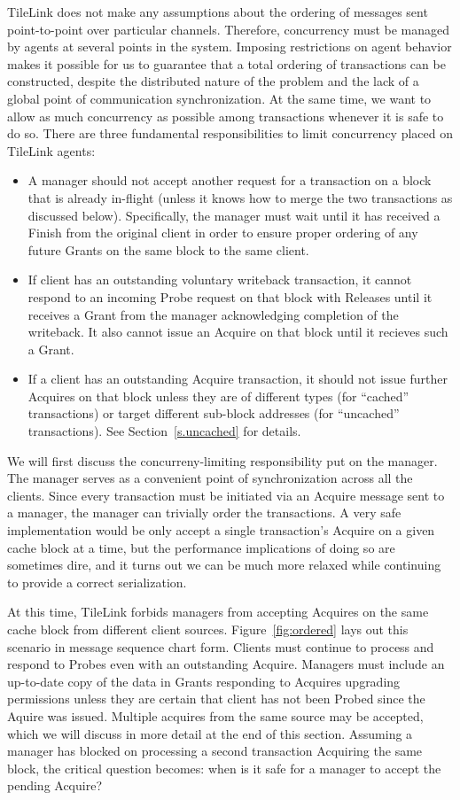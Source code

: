 TileLink does not make any assumptions about the ordering of messages sent point-to-point over particular channels.
Therefore, concurrency must be managed by agents at several points in the system.
Imposing restrictions on agent behavior makes it possible for us to guarantee that a total ordering of transactions can be constructed,
despite the distributed nature of the problem and the lack of a global point of communication synchronization.
At the same time, we want to allow as much concurrency as possible among transactions whenever it is safe to do so.
There are three fundamental responsibilities to limit concurrency placed on TileLink agents:
\begin{itemize}
\item A manager should not accept another request for a transaction on a block that is already in-flight (unless it knows how to merge the two transactions as discussed below). Specifically, the manager must wait until it has received a Finish from the original client in order to ensure proper ordering of any future Grants on the same block to the same client.
\item If client has an outstanding voluntary writeback transaction, it cannot respond to an incoming Probe request on that block with Releases until it receives a Grant from the manager acknowledging completion of the writeback. It also cannot issue an Acquire on that block until it recieves such a Grant.
\item If a client has an outstanding Acquire transaction, it should not issue further Acquires on that block unless they are of different types (for ``cached'' transactions)
or target different sub-block addresses (for ``uncached'' transactions). See Section~\ref{s.uncached} for details.
\end{itemize}

We will first discuss the concurreny-limiting responsibility put on the manager.
The manager serves as a convenient point of synchronization across all the clients.
Since every transaction must be initiated via an Acquire message sent to a manager, the manager can trivially order the transactions.
A very safe implementation would be only accept a single transaction's Acquire on a given cache block at a time,
but the performance implications of doing so are sometimes dire, and it turns out we can be much more relaxed while continuing to provide a correct serialization.

At this time, TileLink forbids managers from accepting Acquires on the same cache block from different client sources.
Figure~\ref{fig:ordered} lays out this scenario in message sequence chart form.
Clients must continue to process and respond to Probes even with an outstanding Acquire.
Managers must include an up-to-date copy of the data in Grants responding to Acquires upgrading permissions unless they are certain that
client has not been Probed since the Aquire was issued.
Multiple acquires from the same source may be accepted, which we will discuss in more detail at the end of this section.
Assuming a manager has blocked on processing a second transaction Acquiring the same block, the critical question becomes: when is it safe for a manager to accept the pending Acquire?

